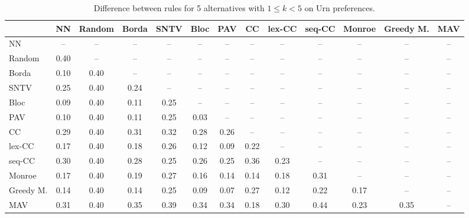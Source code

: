 
\begin{table*}[htbp]
\centering
\begin{tabular}{lcccccccccccc}
\toprule
 & NN & Random & Borda & SNTV & Bloc & PAV & CC & lex-CC & seq-CC & Monroe & Greedy M. & MAV \\
\midrule
NN & -- & -- & -- & -- & -- & -- & -- & -- & -- & -- & -- & -- \\
Random & \cellcolor{blue!40} 0.40 & -- & -- & -- & -- & -- & -- & -- & -- & -- & -- & -- \\
Borda & \cellcolor{blue!10} 0.10 & \cellcolor{blue!40} 0.40 & -- & -- & -- & -- & -- & -- & -- & -- & -- & -- \\
SNTV & \cellcolor{blue!25} 0.25 & \cellcolor{blue!40} 0.40 & \cellcolor{blue!24} 0.24 & -- & -- & -- & -- & -- & -- & -- & -- & -- \\
Bloc & \cellcolor{blue!9} 0.09 & \cellcolor{blue!40} 0.40 & \cellcolor{blue!11} 0.11 & \cellcolor{blue!25} 0.25 & -- & -- & -- & -- & -- & -- & -- & -- \\
PAV & \cellcolor{blue!10} 0.10 & \cellcolor{blue!40} 0.40 & \cellcolor{blue!11} 0.11 & \cellcolor{blue!25} 0.25 & \cellcolor{blue!3} 0.03 & -- & -- & -- & -- & -- & -- & -- \\
CC & \cellcolor{blue!28} 0.29 & \cellcolor{blue!40} 0.40 & \cellcolor{blue!31} 0.31 & \cellcolor{blue!32} 0.32 & \cellcolor{blue!28} 0.28 & \cellcolor{blue!26} 0.26 & -- & -- & -- & -- & -- & -- \\
lex-CC & \cellcolor{blue!17} 0.17 & \cellcolor{blue!40} 0.40 & \cellcolor{blue!18} 0.18 & \cellcolor{blue!26} 0.26 & \cellcolor{blue!12} 0.12 & \cellcolor{blue!9} 0.09 & \cellcolor{blue!22} 0.22 & -- & -- & -- & -- & -- \\
seq-CC & \cellcolor{blue!30} 0.30 & \cellcolor{blue!40} 0.40 & \cellcolor{blue!28} 0.28 & \cellcolor{blue!25} 0.25 & \cellcolor{blue!26} 0.26 & \cellcolor{blue!25} 0.25 & \cellcolor{blue!36} 0.36 & \cellcolor{blue!23} 0.23 & -- & -- & -- & -- \\
Monroe & \cellcolor{blue!17} 0.17 & \cellcolor{blue!40} 0.40 & \cellcolor{blue!19} 0.19 & \cellcolor{blue!27} 0.27 & \cellcolor{blue!16} 0.16 & \cellcolor{blue!14} 0.14 & \cellcolor{blue!14} 0.14 & \cellcolor{blue!18} 0.18 & \cellcolor{blue!31} 0.31 & -- & -- & -- \\
Greedy M. & \cellcolor{blue!14} 0.14 & \cellcolor{blue!40} 0.40 & \cellcolor{blue!14} 0.14 & \cellcolor{blue!25} 0.25 & \cellcolor{blue!9} 0.09 & \cellcolor{blue!7} 0.07 & \cellcolor{blue!27} 0.27 & \cellcolor{blue!12} 0.12 & \cellcolor{blue!22} 0.22 & \cellcolor{blue!17} 0.17 & -- & -- \\
MAV & \cellcolor{blue!31} 0.31 & \cellcolor{blue!40} 0.40 & \cellcolor{blue!35} 0.35 & \cellcolor{blue!39} 0.39 & \cellcolor{blue!34} 0.34 & \cellcolor{blue!34} 0.34 & \cellcolor{blue!18} 0.18 & \cellcolor{blue!30} 0.30 & \cellcolor{blue!44} 0.44 & \cellcolor{blue!23} 0.23 & \cellcolor{blue!35} 0.35 & -- \\
\bottomrule
\end{tabular}

\caption{Difference between rules for 5 alternatives with $1 \leq k < 5$ on Urn preferences.}
\label{tab:rule_distance_heatmap-m=[5]-pref_dist=URN-R}
\end{table*}
    